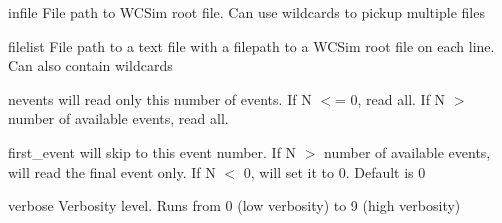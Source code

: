 \begin{DoxyItemize}
\item {\ttfamily infile} File path to W\-C\-Sim root file. Can use wildcards to pickup multiple files
\item {\ttfamily filelist} File path to a text file with a filepath to a W\-C\-Sim root file on each line. Can also contain wildcards
\item {\ttfamily nevents} will read only this number of events. If {\ttfamily N $<$= 0}, read all. If {\ttfamily N $>$ number of available events}, read all.
\item {\ttfamily first\-\_\-event} will skip to this event number. If {\ttfamily N $>$ number of available events}, will read the final event only. If {\ttfamily N $<$ 0}, will set it to 0. Default is 0
\item {\ttfamily verbose} Verbosity level. Runs from 0 (low verbosity) to 9 (high verbosity) 
\end{DoxyItemize}